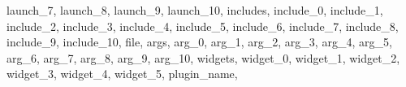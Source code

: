 {{                    launch_7,
                    launch_8,
                    launch_9,
                    launch_10,
                    includes,
                        include_0,
                        include_1,
                        include_2,
                        include_3,
                        include_4,
                        include_5,
                        include_6,
                        include_7,
                        include_8,
                        include_9,
                        include_10,
                            file,
                            args,
                                arg_0,
                                arg_1,
                                arg_2,
                                arg_3,
                                arg_4,
                                arg_5,
                                arg_6,
                                arg_7,
                                arg_8,
                                arg_9,
                                arg_10,
                widgets,
                    widget_0,
                    widget_1,
                    widget_2,
                    widget_3,
                    widget_4,
                    widget_5,
                        plugin_name,
        }
    }
    
